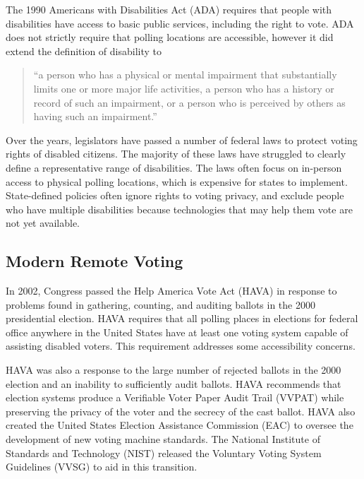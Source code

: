 The 1990 Americans with Disabilities Act (ADA) requires that people
with disabilities have access to basic public services, including the
right to vote. ADA does not strictly require that polling locations
are accessible, however it did extend the definition of disability to
\begin{quote}
  ``a person who has a physical or mental impairment that
  substantially limits one or more major life activities, a person who
  has a history or record of such an impairment, or a person who is
  perceived by others as having such an impairment.''
\end{quote}

Over the years, legislators have passed a number of federal laws to
protect voting rights of disabled citizens. The majority of these laws
have struggled to clearly define a representative range of
disabilities. The laws often focus on in-person access to physical
polling locations, which is expensive for states to
implement. State-defined policies often ignore rights to voting
privacy, and exclude people who have multiple disabilities because
technologies that may help them vote are not yet available.



\subsection{Modern Remote Voting}

In 2002, Congress passed the Help America Vote Act (HAVA) in response
to problems found in gathering, counting, and auditing ballots in the
2000 presidential election. HAVA requires that all polling places in
elections for federal office anywhere in the United States have at
least one voting system capable of assisting disabled voters. This
requirement addresses some accessibility concerns.

HAVA was also a response to the large number of rejected ballots in
the 2000 election and an inability to sufficiently audit ballots. HAVA
recommends that election systems produce a Verifiable Voter Paper
Audit Trail (VVPAT) while preserving the privacy of the voter and the
secrecy of the cast ballot. HAVA also created the United States
Election Assistance Commission (EAC) to oversee the development of new
voting machine standards. The National Institute of Standards and
Technology (NIST) released the Voluntary Voting System Guidelines
(VVSG) to aid in this transition.

